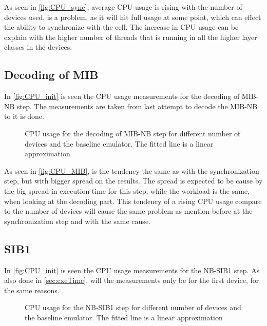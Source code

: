 As seen in \autoref{fig:CPU_sync}, average CPU usage is rising with the number of devices used, is a problem, as it will hit full usage at some point, which can effect the ability to synchronize with the cell. The increase in CPU usage can be explain with the higher number of threads that is running in all the higher layer classes in the devices.

\subsection{Decoding of MIB}
In \autoref{fig:CPU_init} is seen the CPU usage measurements for the decoding of MIB-NB step. The measurements are taken from last attempt to decode the MIB-NB to it is done.

\begin{figure}[H]
\centering
\resizebox{0.5\textwidth}{!}{
}
\caption{CPU usage for the decoding of MIB-NB step for different number of devices and the baseline emulator. The fitted line is a linear approximation}
\label{fig:CPU_MIB}
\end{figure}

As seen in \autoref{fig:CPU_MIB}, is the tendency the same as with the synchronization step, but with bigger spread on the results. The spread is expected to be cause by the big spread in execution time for this step, while the workload is the same, when looking at the decoding part. This tendency of a rising CPU usage compare to the number of devices will cause the same problem as mention before at the synchronization step and with the same cause.

\subsection{SIB1}
In \autoref{fig:CPU_init} is seen the CPU usage measurements for the NB-SIB1 step. As also done in \autoref{sec:exeTime}, will the measurements only be for the first device, for the same reasons.

\begin{figure}[H]
\centering
\resizebox{0.5\textwidth}{!}{
}
\caption{CPU usage for the NB-SIB1 step for different number of devices and the baseline emulator. The fitted line is a linear approximation}
\label{fig:CPU_SIB1}
\end{figure}


